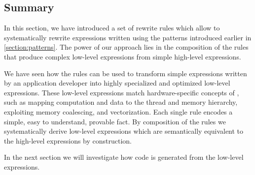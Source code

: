 \FloatBarrier



\subsection{Summary}
In this section, we have introduced a set of rewrite rules which allow to systematically rewrite expressions written using the patterns introduced earlier in \autoref{section:patterns}.
The power of our approach lies in the composition of the rules that produce complex low-level expressions from simple high-level expressions.

We have seen how the rules can be used to transform simple expressions written by an application developer into highly specialized and optimized low-level \OpenCL expressions.
These low-level expressions match hardware-specific concepts of \OpenCL, such as mapping computation and data to the thread and memory hierarchy, exploiting memory coalescing, and vectorization.
Each single rule encodes a simple, easy to understand, provable fact.
By composition of the rules we systematically derive low-level expressions which are semantically equivalent to the high-level expressions by construction.

In the next section we will investigate how \OpenCL code is generated from the low-level expressions.

